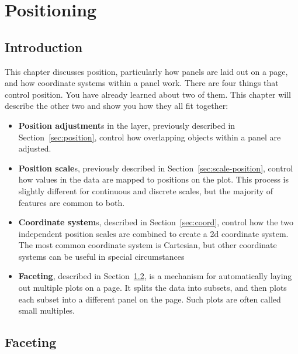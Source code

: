 
% 


\chapter{Positioning}
\label{cha:position}

\section{Introduction}

This chapter discusses position, particularly how panels are laid out on a page, and how coordinate systems within a panel work.  There are four things that control position.  You have already learned about two of them.  This chapter will describe the other two and show you how they all fit together:

\begin{itemize}
  \item {\bf Position adjustment}s in the layer, previously described in Section~\ref{sec:position}, control how overlapping objects within a panel are adjusted.

  \item {\bf Position scale}s, previously described in Section~\ref{sec:scale-position}, control how values in the data are mapped to positions on the plot.  This process is slightly different for continuous and discrete scales, but the majority of features are common to both.

  \item {\bf Coordinate system}s, described in Section~\ref{sec:coord}, control how the two independent position scales are combined to create a 2d coordinate system.  The most common coordinate system is Cartesian, but other coordinate systems can be useful in special circumstances

  \item {\bf Faceting}, described in Section~\ref{sec:faceting}, is a mechanism for automatically laying out multiple plots on a page.  It splits the data into subsets, and then plots each subset into a different panel on the page.  Such plots are often called small multiples.  
  
\end{itemize}

\section{Faceting}
\label{sec:faceting}


